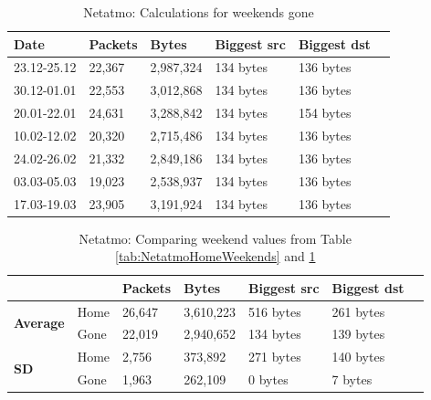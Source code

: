 \begin{table}[H]
    \centering
    \caption{Netatmo: Calculations for weekends gone}
    \begin{tabular}{|l|l|l|l|l|l|}
    \hline
        \textbf{Date} & \textbf{Packets} & \textbf{Bytes} & \textbf{Biggest src} & \textbf{Biggest dst} \\ \hline
        23.12-25.12   & 22,367           & 2,987,324      & 134 bytes            & 136 bytes            \\ \hline
        30.12-01.01   & 22,553           & 3,012,868      & 134 bytes            & 136 bytes            \\ \hline
        20.01-22.01   & 24,631           & 3,288,842      & 134 bytes            & 154 bytes            \\ \hline
        10.02-12.02   & 20,320           & 2,715,486      & 134 bytes            & 136 bytes            \\ \hline
        24.02-26.02   & 21,332           & 2,849,186      & 134 bytes            & 136 bytes            \\ \hline
        03.03-05.03   & 19,023           & 2,538,937      & 134 bytes            & 136 bytes            \\ \hline
        17.03-19.03   & 23,905           & 3,191,924      & 134 bytes            & 136 bytes            \\ \hline
    \end{tabular}
    \label{tab:NetatmoGoneWeekends}
\end{table}

\begin{table}[H]
    \centering
    \caption{Netatmo: Comparing weekend values from Table \ref{tab:NetatmoHomeWeekends} and \ref{tab:NetatmoGoneWeekends}}
    \begin{tabular}{ll|l|l|l|l|l|}
        \cline{3-6}
        &      & \textbf{Packets} & \textbf{Bytes} & \textbf{Biggest src} & \textbf{Biggest dst} \\ \hline
    \multicolumn{1}{|l|}{\multirow{2}{*}{\textbf{Average}}} & Home & 26,647          & 3,610,223    & 516 bytes                 & 261 bytes                 \\ \cline{2-6} 
    \multicolumn{1}{|l|}{}                              & Gone & 22,019          & 2,940,652    & 134 bytes                    & 139 bytes                 \\ \hline
    \multicolumn{1}{|l|}{\multirow{2}{*}{\textbf{SD}}} & Home & 2,756            & 373,892      & 271 bytes                 & 140 bytes                 \\ \cline{2-6} 
    \multicolumn{1}{|l|}{}                             & Gone & 1,963            & 262,109      & 0 bytes                   & 7 bytes                   \\ \hline
    \end{tabular}
    \label{tab:NetatmoWeekends}
\end{table}

